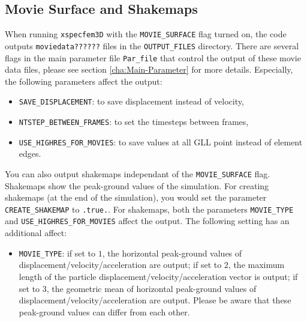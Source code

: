 \subsection{Movie Surface and Shakemaps}

When running \texttt{xspecfem3D} with the \texttt{MOVIE\_SURFACE}
flag turned on, the code outputs \texttt{moviedata??????} files in
the \texttt{OUTPUT\_FILES} directory. There are several flags in the
main parameter file \texttt{Par\_file} that control the output of
these movie data files, please see section \ref{cha:Main-Parameter} for
more details. Especially, the following parameters affect the output:
\begin{itemize}
\item \texttt{\small SAVE\_DISPLACEMENT}: to save displacement instead of velocity,
\item \texttt{\small NTSTEP\_BETWEEN\_FRAMES}: to set the timesteps between frames,
\item \texttt{\small USE\_HIGHRES\_FOR\_MOVIES}: to save values at all GLL point instead of element edges.
\end{itemize}

You can also output shakemaps independant of the \texttt{MOVIE\_SURFACE} flag. Shakemaps show the peak-ground values of the simulation. For creating shakemaps (at the end of the simulation), you would set the parameter
\texttt{\small CREATE\_SHAKEMAP} to \texttt{\small .true.}.
For shakemaps, both the parameters \texttt{\small MOVIE\_TYPE} and \texttt{\small USE\_HIGHRES\_FOR\_MOVIES} affect the output. The following setting has an additional affect:
\begin{itemize}
\item \texttt{\small MOVIE\_TYPE}: if set to $1$, the horizontal peak-ground values of displacement/velocity/acceleration are output; if set to $2$, the maximum length of the particle displacement/velocity/acceleration vector is output; if set to $3$, the geometric mean of horizontal peak-ground values of displacement/velocity/acceleration are output. Please be aware that these peak-ground values can differ from each other.
\end{itemize}

